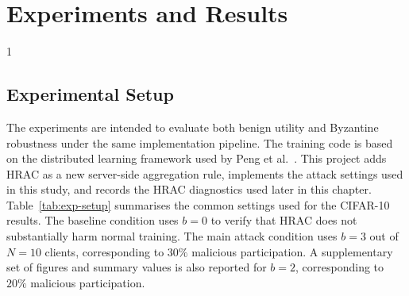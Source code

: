 \doublespacing %

\chapter{Experiments and Results}
\label{ch:experiments-results}

\begin{spacing}{1}
\minitoc
\end{spacing}
\thesisspacing

\section{Experimental Setup}
\label{sec:experimental-setup}

The experiments are intended to evaluate both benign utility and Byzantine
robustness under the same implementation pipeline. The training code is based on
the distributed learning framework used by Peng et
al.~\cite{JMLR:v26:24-1307}. This project adds HRAC as a new server-side
aggregation rule, implements the attack settings used in this study, and records
the HRAC diagnostics used later in this chapter. Table~\ref{tab:exp-setup}
summarises the common settings used for the CIFAR-10 results. The baseline
condition uses $b=0$ to verify that HRAC does not substantially harm normal
training. The main attack condition uses $b=3$ out of $N=10$ clients,
corresponding to $30\%$ malicious participation. A supplementary set of
figures and summary values is also reported for $b=2$, corresponding to
$20\%$ malicious participation.

